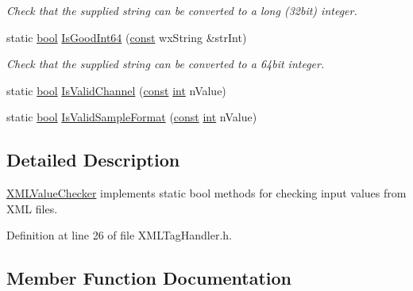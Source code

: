\begin{DoxyCompactItemize}
\begin{DoxyCompactList}\small\item\em Check that the supplied string can be converted to a long (32bit) integer. \end{DoxyCompactList}\item 
static \hyperlink{mac_2config_2i386_2lib-src_2libsoxr_2soxr-config_8h_abb452686968e48b67397da5f97445f5b}{bool} \hyperlink{class_x_m_l_value_checker_aeef4556c638f9979f6d739154ecd18f6}{Is\+Good\+Int64} (\hyperlink{getopt1_8c_a2c212835823e3c54a8ab6d95c652660e}{const} wx\+String \&str\+Int)
\begin{DoxyCompactList}\small\item\em Check that the supplied string can be converted to a 64bit integer. \end{DoxyCompactList}\item 
static \hyperlink{mac_2config_2i386_2lib-src_2libsoxr_2soxr-config_8h_abb452686968e48b67397da5f97445f5b}{bool} \hyperlink{class_x_m_l_value_checker_a391cb5648030e28716d3775e8b4dd955}{Is\+Valid\+Channel} (\hyperlink{getopt1_8c_a2c212835823e3c54a8ab6d95c652660e}{const} \hyperlink{xmltok_8h_a5a0d4a5641ce434f1d23533f2b2e6653}{int} n\+Value)
\item 
static \hyperlink{mac_2config_2i386_2lib-src_2libsoxr_2soxr-config_8h_abb452686968e48b67397da5f97445f5b}{bool} \hyperlink{class_x_m_l_value_checker_aa2082800dc3344f71c300628875daa57}{Is\+Valid\+Sample\+Format} (\hyperlink{getopt1_8c_a2c212835823e3c54a8ab6d95c652660e}{const} \hyperlink{xmltok_8h_a5a0d4a5641ce434f1d23533f2b2e6653}{int} n\+Value)
\end{DoxyCompactItemize}


\subsection{Detailed Description}
\hyperlink{class_x_m_l_value_checker}{X\+M\+L\+Value\+Checker} implements static bool methods for checking input values from X\+ML files. 

Definition at line 26 of file X\+M\+L\+Tag\+Handler.\+h.



\subsection{Member Function Documentation}
